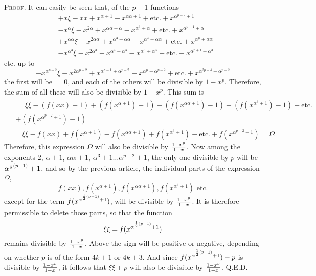 \documentclass[twoside,12pt]{memoir}
\let\oldfrac\frac
\def\frac#1#2{\mathchoice{\tfrac{#1}{#2}}{\oldfrac{#1}{#2}}{\genfrac{}{}{}{2}{#1}{#2\mathstrut}}{\genfrac{}{}{}{3}{#1}{#2\mathstrut}}}
\begin{document}
\textsc{Proof.} It can easily be seen that, of the \(p-1\) functions
\[\begin{aligned}
& +x \xi-x x+x^{\alpha+1}-x^{\alpha \alpha+1}+\text{etc{.}}+x^{\alpha^{p-2}+1} \\
& -x^{\alpha} \xi-x^{2 \alpha}+x^{\alpha \alpha+\alpha}-x^{\alpha^{3}+\alpha}+\text{etc{.}}+x^{\alpha^{p-1}+\alpha} \\
& +x^{\alpha \alpha} \xi-x^{2 \alpha \alpha}+x^{\alpha^{3}+\alpha \alpha}-x^{\alpha^{4}+\alpha \alpha}+\text{etc{.}}+x^{\alpha^{p}+\alpha \alpha} \\
& -x^{\alpha^{3}} \xi-x^{2 \alpha^{3}}+x^{\alpha^{4}+\alpha^{3}}-x^{\alpha^{5}+\alpha^{3}}+\text{etc{.}}+x^{\alpha^{p+1}+\alpha^{3}}
\end{aligned}\]
etc{.} up to
\[-x^{\alpha^{p-2}} \xi-x^{2 \alpha^{p-2}}+x^{\alpha^{p-1}+\alpha^{p-2}}-x^{\alpha^{p}+\alpha^{p-2}}+\text{etc{.}}+x^{\alpha^{2 p-4}+\alpha^{p-2}}\]
the first will be \(=0\), and each of the others will be divisible by \(1-x^{p}\). Therefore, the sum of all these will also be divisible by \(1-x^{p}\).  This sum is
\[\begin{aligned}
&\begin{gathered}=\xi \xi-(f(x x)-1)+(f(x^{\alpha+1})-1)-(f(x^{\alpha \alpha+1})-1)+(f(x^{\alpha^{3}+1})-1)-\text{etc{.}}\\
+(f(x^{\alpha^{p-2}+1})-1) \end{gathered}\\
&=\xi \xi-f(x x)+f(x^{\alpha+1})-f(x^{\alpha \alpha+1})+f(x^{\alpha^{3}+1})-\text{etc{.}}+f(x^{\alpha^{p-2}+1})=\Omega
\end{aligned}\]
Therefore, this expression \(\Omega\) will also be divisible by \(\frac{1-x^{p}}{1-x}\). Now among the exponents \(2\), \(\alpha+1\), \(\alpha \alpha+1\), \(\alpha^{3}+1 \ldots \alpha^{p-2}+1\), the only one divisible by \(p\) will be \(\alpha^{\frac{1}{2}(p-1)}+1\), and so by the previous article, the individual parts of the expression \(\Omega\),
\[f(x x), f(x^{\alpha+1}), f(x^{\alpha \alpha+1}), f(x^{\alpha^{3}+1}) \text{ etc{.}}\]
except for the term \(f(x^{\alpha^{\frac{1}{2}(p-1)}+1})\), will be divisible by \(\frac{1-x^{p}}{1-x}\). It is therefore permissible to delete those parts, so that the function
\[\xi \xi \mp f(x^{\alpha^{\frac{1}{2}(p-1)}+1})\]\pagebreak%
remains divisible by \(\frac{1-x^{p}}{1-x}\). Above the sign will be positive or negative, depending on whether \(p\) is of the form \(4k+1\) or \(4k+3\).  And since \(f(x^{\alpha^{\frac{1}{2}(p-1)}+1})-p\) is divisible by \(\frac{1-x^{p}}{1-x}\), it follows that \(\xi \xi \mp p\) will also be divisible by \(\frac{1-x^{p}}{1-x}\). Q.E.D.
\end{document}
